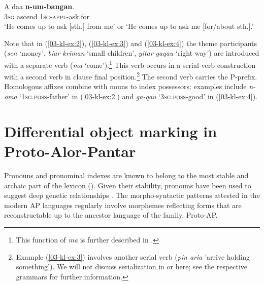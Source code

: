 \documentclass[output=paper]{LSP/langsci}
\begin{document}
\ex
\label{03-kl-ex:5}
\gll A daa \textbf{n-um-bangan}.\\
3\textsc{sg} ascend 1\textsc{sg}-\textsc{appl}-ask.for\\
\glt ‘He comes up to ask [sth.] from me’ or ‘He comes up to ask me [for/about sth.].’ 
\z
\z

Note that in (\ref{03-kl-ex:2}), (\ref{03-kl-ex:3}) and (\ref{03-kl-ex:4}) the theme participants (\textit{sen} ‘money’, \textit{biar kriman} ‘small children’, \textit{yitar gaqau}
‘right way’) are introduced with a separate verb (\textit{ma}
‘come’).\footnote{This function of  \textit{ma} is further
 described in \citet{Klamer2010Grammar,Klamer2010Ditransitive}.} This verb occurs in a serial verb construction with a second verb in clause final
position.\footnote{Example (\ref{03-kl-ex:3}) involves another serial verb
 (\textit{pin aria} 'arrive holding something’). We will not discuss
 serialization in  or  here; see the respective grammars for
 further information.} The second verb carries the P-prefix. Homologous affixes combine with nouns to index possessors: examples include \textit{n-oma} ‘1\textsc{sg}.\textsc{poss}-father’ in (\ref{03-kl-ex:2}) and
\textit{ga-qau} ‘3\textsc{sg}.\textsc{poss}-good’ in (\ref{03-kl-ex:4}).


\section{Differential object marking in Proto-Alor-Pantar} \label{03-kl-sec:3}

Pronouns and pronominal indexes are known to belong to the most stable and archaic part of the lexicon (\citealt{Filimonova2005Noun,Heineetal2011Genesis,Heineetal2011Grammaticalization}).
 Given their stability, pronouns have been used to
suggest deep genetic relationships \citep{Nicholsetal2013M}. The
morpho-syntactic patterns attested in the modern AP languages
regularly involve morphemes reflecting forms that are reconstructable
up to the ancestor language of the family, Proto-AP.
\end{document}
